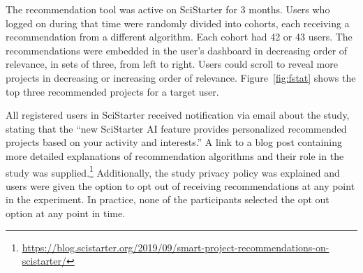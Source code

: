 \documentclass[letterpaper]{article} %
\begin{document}
The recommendation tool  was active on SciStarter  for 3 months. Users who logged on during that time were randomly divided into cohorts, each receiving a recommendation 
from a different algorithm. Each cohort had 42 or 43 users.  
 The recommendations were embedded in the user's 
dashboard in decreasing order of relevance, in sets of three,  from left to right. Users could scroll   
to reveal more projects in decreasing or increasing order of relevance. Figure~\ref{fig:fstat} shows the   top three recommended projects for a target user.


All registered users  in SciStarter received notification via email about the study, stating that the  ``new SciStarter AI feature provides personalized recommended projects based on your activity and interests.'' A link to a blog post containing more 
detailed explanations of recommendation algorithms and their role in the study was supplied.\footnote{\url{https://blog.scistarter.org/2019/09/smart-project-recommendations-on-scistarter/}} Additionally, the study privacy policy was explained and users were given the option to opt out of 
receiving recommendations at any point in the experiment.  In practice, none of the participants selected the opt out option at any point in time.
  
  
\end{document}

